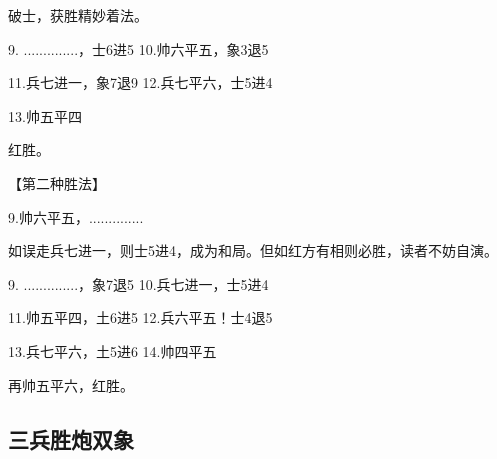 \documentclass[UTF8]{ctexbook}
\begin{document}
破士，获胜精妙着法。

9. ..............，士6进5 \qquad 10.帅六平五，象3退5

11.兵七进一，象7退9 \qquad 12.兵七平六，士5进4

13.帅五平四

红胜。

【第二种胜法】

9.帅六平五，..............

如误走兵七进一，则士5进4，成为和局。但如红方有相则必胜，读者不妨自演。

9. ..............，象7退5 \qquad 10.兵七进一，士5进4

11.帅五平四，土6进5 \qquad 12.兵六平五！士4退5

13.兵七平六，土5进6 \qquad 14.帅四平五

再帅五平六，红胜。
\subsection{三兵胜炮双象}
\end{document}
